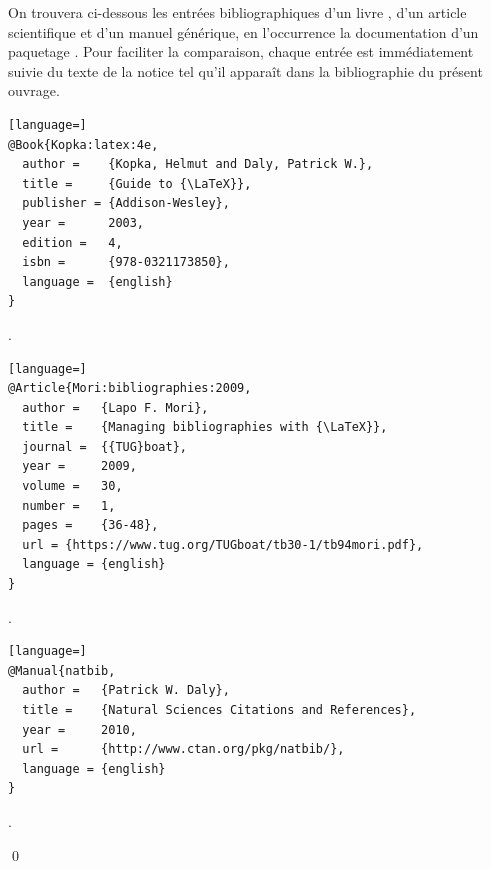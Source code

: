 \begin{exemple}
  \label{ex:bibliographie:bib}
  On trouvera ci-dessous les entrées bibliographiques d'un livre
  \citep{Kopka:latex:4e}, d'un article scientifique
  \citep{Mori:bibliographies:2009} et d'un manuel générique, en
  l'occurrence la documentation d'un paquetage \citep{natbib}. Pour
  faciliter la comparaison, chaque entrée est immédiatement suivie du
  texte de la notice tel qu'il apparaît dans la bibliographie du
  présent ouvrage.

\begin{lstlisting}[language=]
@Book{Kopka:latex:4e,
  author =    {Kopka, Helmut and Daly, Patrick W.},
  title =     {Guide to {\LaTeX}},
  publisher = {Addison-Wesley},
  year =      2003,
  edition =   4,
  isbn =      {978-0321173850},
  language =  {english}
}
\end{lstlisting}

  \begin{framed}
    \noindent {}.
  \end{framed}

\begin{lstlisting}[language=]
@Article{Mori:bibliographies:2009,
  author =   {Lapo F. Mori},
  title =    {Managing bibliographies with {\LaTeX}},
  journal =  {{TUG}boat},
  year =     2009,
  volume =   30,
  number =   1,
  pages =    {36-48},
  url =	{https://www.tug.org/TUGboat/tb30-1/tb94mori.pdf},
  language = {english}
}
\end{lstlisting}

  \begin{framed}
    \noindent {}.
  \end{framed}

\begin{lstlisting}[language=]
@Manual{natbib,
  author =   {Patrick W. Daly},
  title =    {Natural Sciences Citations and References},
  year =     2010,
  url =      {http://www.ctan.org/pkg/natbib/},
  language = {english}
}
\end{lstlisting}

  \begin{framed}
    \noindent {}.
  \end{framed}
  \qed
\end{exemple}


